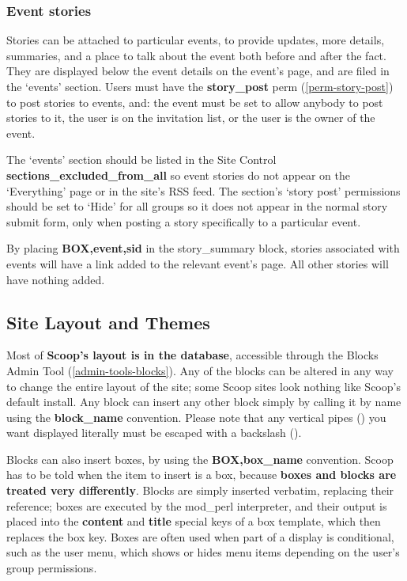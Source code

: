 \subsubsection{Event stories}
\label{features-calendar-stories}

Stories can be attached to particular events, to provide updates, more details, summaries, and a place to talk about the event both before and after the fact. They are displayed below the event details on the event's page, and are filed in the `events' section. Users must have the {\bf story\_post} perm (\ref{perm-story-post}) to post stories to events, and: the event must be set to allow anybody to post stories to it, the user is on the invitation list, or the user is the owner of the event.

The `events' section should be listed in the Site Control {\bf sections\_excluded\_from\_all} so event stories do not appear on the `Everything' page or in the site's RSS feed. The section's `story post' permissions should be set to `Hide' for all groups so it does not appear in the normal story submit form, only when posting a story specifically to a particular event.

By placing {\bf \latexhtml{$\vert$}{|}BOX,event,\latexhtml{$\vert$}{|}sid\latexhtml{$\vert$}{|}\latexhtml{$\vert$}{|}} in the story\_summary block, stories associated with events will have a link added to the relevant event's page. All other stories will have nothing added.

\subsection{Site Layout and Themes}
\label{features-custom}

Most of {\bf Scoop's layout is in the database}, accessible through the Blocks Admin Tool (\ref{admin-tools-blocks}).  Any of the blocks can be altered in any way to change the entire layout of the site; some Scoop sites look nothing like Scoop's default install.  Any block can insert any other block simply by calling it by name using the {\bf \latexhtml{$\vert$}{|}block\_name\latexhtml{$\vert$}{|}} convention.  Please note that any vertical pipes (\latexhtml{$\vert$}{|}) you want displayed literally must be escaped with a backslash (\latexhtml{$\backslash$$\vert$}{\\|}).

Blocks can also insert boxes, by using the {\bf \latexhtml{$\vert$}{|}BOX,box\_name\latexhtml{$\vert$}{|}} convention.  Scoop has to be told when the item to insert is a box, because {\bf boxes and blocks are treated very differently}.  Blocks are simply inserted verbatim, replacing their reference; boxes are executed by the mod\_perl interpreter, and their output is placed into the {\bf content} and {\bf title} special keys of a box template, which then replaces the box key.  Boxes are often used when part of a display is conditional, such as the user menu, which shows or hides menu items depending on the user's group permissions.

